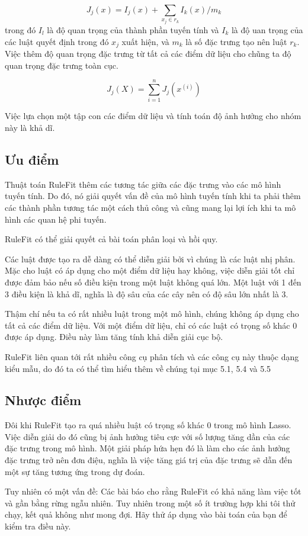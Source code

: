 $$J_j(x)=I_j(x)+\sum_{x_j\in{}r_k}I_k(x)/m_k$$
trong đó $I_l$ là độ quan trọng của thành phần tuyến tính và $I_k$ là độ uan trọng của các luật quyết định trong đó $x_j$ xuất hiện, và $m_k$ là số đặc trưng tạo nên luật $r_k$. Việc thêm độ quan trọng đặc trưng từ tất cả các điểm dữ liệu cho chũng ta độ quan trọng đặc trưng toàn cục.

$$J_j(X)=\sum_{i=1}^n{}J_j(x^{(i)})$$

Việc lựa chọn một tập con các điểm dữ liệu và tính toán độ ảnh hưởng cho nhóm này là khả dĩ.

\subsection{Ưu điểm}
Thuật toán RuleFit thêm các tương tác giữa các đặc trưng vào các mô hình tuyến tính. Do đó, nó giải quyết vấn đề của mô hình tuyến tính khi ta phải thêm các thành phần tương tác một cách thủ công và cũng mang lại lợi ích khi ta mô hình các quan hệ phi tuyến.

RuleFit có thể giải quyết cả bài toán phân loại và hồi quy.

Các luật được tạo ra dễ dàng có thể diễn giải bởi vì chúng là các luật nhị phân. Mặc cho luật có áp dụng cho một điểm dữ liệu hay không, việc diễn giải tốt chỉ được đảm bảo nếu số điều kiện trong một luật không quá lớn. Một luật với 1 đến 3 điều kiện là khả dĩ, nghĩa là độ sâu của các cây nên có độ sâu lớn nhất là 3.

Thậm chí nếu ta có rất nhiều luật trong một mô hình, chúng không áp dụng cho tất cả các điểm dữ liệu. Với một điểm dữ liệu, chỉ có các luật có trọng số khác 0 được áp dụng. Điều này làm tăng tính khả diễn giải cục bộ.

RuleFit liên quan tới rất nhiều công cụ phân tích và các công cụ này thuộc dạng kiểu mẫu, do đó ta có thể tìm hiểu thêm về chúng tại mục 5.1, 5.4 và 5.5

\subsection{Nhược điểm}

Đôi khi RuleFit tạo ra quá nhiều luật có trọng số khác 0 trong mô hình Lasso. Việc diễn giải do đó cũng bị ảnh hưởng tiêu cực với số lượng tăng dần của các đặc trưng trong mô hình. Một giải pháp hứa hẹn đó là làm cho các ảnh hưởng đặc trưng trở nên đơn điệu, nghĩa là việc tăng giá trị của đặc trưng sẽ dẫn đến một sự tăng tương ứng trong dự đoán.

Tuy nhiên có một vấn đề: Các bài báo cho rằng RuleFit có khả năng làm việc tốt và gần bằng rừng ngẫu nhiên. Tuy nhiên trong một số ít trường hợp khi tôi thử chạy, kết quả không như mong đợi. Hãy thử áp dụng vào bài toán của bạn để kiểm tra điều này.

